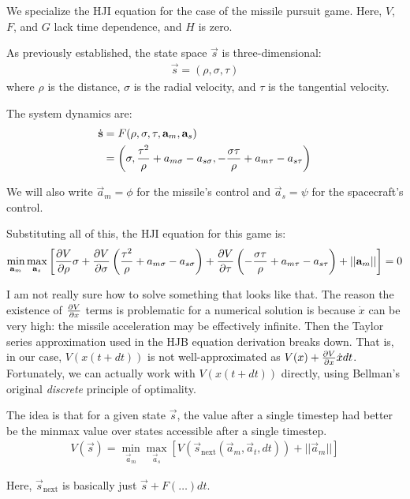 \documentclass{article}
\begin{document}
We specialize the HJI equation for the case of the missile pursuit game.
Here, $V$, $F$, and $G$ lack time dependence, and $H$ is zero.

As previously established, the state space $\vec{s}$ is three-dimensional:
\begin{align}
\vec{s} = (\rho, \sigma, \tau)
\end{align}
where $\rho$ is the distance, $\sigma$ is the radial velocity, and $\tau$ is the
tangential velocity.

The system dynamics are:
\begin{align}
\dot{\vec{s}}
&= F(\rho, \sigma, \tau, \vec{a}_m, \vec{a}_s) \notag \\
&= \left(\sigma,
  \frac{\tau^2}{\rho} + a_{m\sigma} - a_{s\sigma},
  -\frac{\sigma\tau}{\rho} + a_{m\tau} - a_{s\tau}\right)
\end{align}

We will also write $\vec{a}_m = \phi$ for the missile's control and $\vec{a}_s =
\psi$ for the spacecraft's control.

Substituting all of this, the HJI equation for this game is:
\begin{align}
\min_{\vec{a}_m} \max_{\vec{a}_s} \left[
  \pdv{V}{\rho} \sigma
+ \pdv{V}{\sigma} \left(\frac{\tau^2}{\rho} + a_{m\sigma} - a_{s\sigma}\right)
+ \pdv{V}{\tau} \left(-\frac{\sigma\tau}{\rho} + a_{m\tau} - a_{s\tau}\right)
+ ||\vec{a}_m||
\right] = 0
\end{align}

I am not really sure how to solve something that looks like that.
The reason the existence of $\pdv{V}{x}$ terms is problematic for a numerical
solution is because $\dot{x}$ can be very high: the missile acceleration may be
effectively infinite.
Then the Taylor series approximation used in the HJB equation derivation breaks
down.
That is, in our case, $V(x(t + dt))$ is not well-approximated as $V(x) +
\pdv{V}{x} \dot{x} dt$.
Fortunately, we can actually work with $V(x(t + dt))$ directly, using Bellman's
original \textit{discrete} principle of optimality.

The idea is that for a given state $\vec{s}$, the value after a single timestep
had better be the minmax value over states accessible after a single timestep.
\begin{align}
V(\vec{s}) = \min_{\vec{a}_m} \max_{\vec{a}_s} \left[
  V(\vec{s}_\text{next}(\vec{a}_m, \vec{a}_t, dt)) +
  ||\vec{a}_m||
\right]
\end{align}

Here, $\vec{s}_\text{next}$ is basically just $\vec{s} + F(\dots) dt$.
\end{document}
